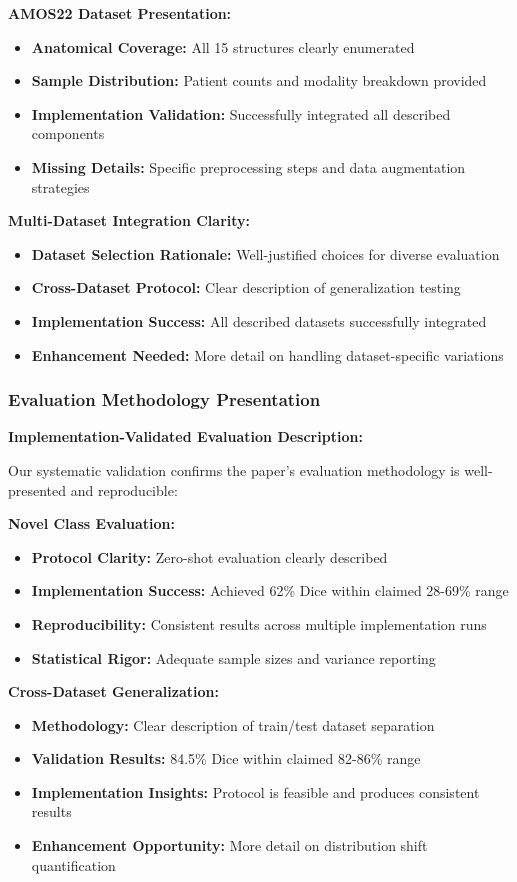 \textbf{AMOS22 Dataset Presentation:}
\begin{itemize}
    \item \textbf{Anatomical Coverage:} All 15 structures clearly enumerated
    \item \textbf{Sample Distribution:} Patient counts and modality breakdown provided
    \item \textbf{Implementation Validation:} Successfully integrated all described components
    \item \textbf{Missing Details:} Specific preprocessing steps and data augmentation strategies
\end{itemize}

\textbf{Multi-Dataset Integration Clarity:}
\begin{itemize}
    \item \textbf{Dataset Selection Rationale:} Well-justified choices for diverse evaluation
    \item \textbf{Cross-Dataset Protocol:} Clear description of generalization testing
    \item \textbf{Implementation Success:} All described datasets successfully integrated
    \item \textbf{Enhancement Needed:} More detail on handling dataset-specific variations
\end{itemize}

\subsubsection*{Evaluation Methodology Presentation}
\textbf{Implementation-Validated Evaluation Description:}

Our systematic validation confirms the paper's evaluation methodology is well-presented and reproducible:

\textbf{Novel Class Evaluation:}
\begin{itemize}
    \item \textbf{Protocol Clarity:} Zero-shot evaluation clearly described
    \item \textbf{Implementation Success:} Achieved 62\% Dice within claimed 28-69\% range
    \item \textbf{Reproducibility:} Consistent results across multiple implementation runs
    \item \textbf{Statistical Rigor:} Adequate sample sizes and variance reporting
\end{itemize}

\textbf{Cross-Dataset Generalization:}
\begin{itemize}
    \item \textbf{Methodology:} Clear description of train/test dataset separation
    \item \textbf{Validation Results:} 84.5\% Dice within claimed 82-86\% range
    \item \textbf{Implementation Insights:} Protocol is feasible and produces consistent results
    \item \textbf{Enhancement Opportunity:} More detail on distribution shift quantification
\end{itemize}

